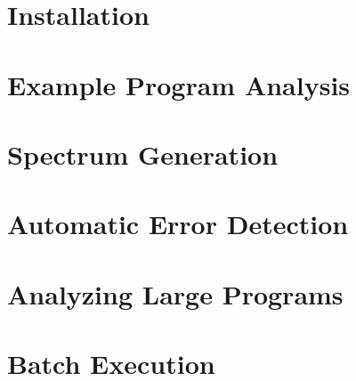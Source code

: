 \documentclass[letterpaper]{report}
\begin{document}
\chapter{Installation}
\label{c:Installation}


 
\chapter{Example Program Analysis}
\label{c:ExampleProgramAnalysis}


  
\chapter{Spectrum Generation}
\label{c:ProgramSpectrumGeneration}


 
\chapter{Automatic Error Detection}
\label{c:AutomaticErrorDetection}


 
\chapter{Analyzing Large Programs}
\label{c:AnalyzingLargePrograms}



\chapter{Batch Execution}
\label{c:BatchExecution}


\end{document}
